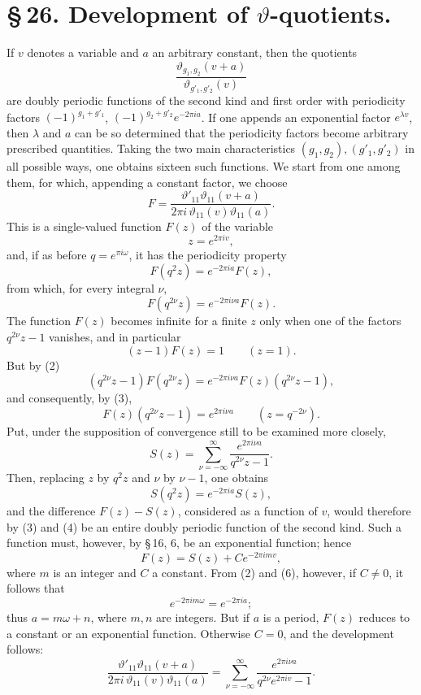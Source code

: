 \documentclass[11pt]{article}
\providecommand{\tht}{\vartheta}
\begin{document}
\section*{\S\,26. Development of $\vartheta$-quotients.}

If $v$ denotes a variable and $a$ an arbitrary constant, then the quotients
\[
\frac{\tht_{g_1,g_2}(v+a)}{\tht_{g'_1,g'_2}(v)}
\]
are doubly periodic functions of the second kind and first order with periodicity factors $(-1)^{g_1+g'_1}$, $(-1)^{g_2+g'_2}e^{-2\pi ia}$. If one appends an exponential factor $e^{\lambda v}$, then $\lambda$ and $a$ can be so determined that the periodicity factors become arbitrary prescribed quantities. Taking the two main characteristics $(g_1,g_2),(g'_1,g'_2)$ in all possible ways, one obtains sixteen such functions. We start from one among them, for which, appending a constant factor, we choose
\begin{equation}
F=\frac{\tht'_{11}\tht_{11}(v+a)}{2\pi i\,\tht_{11}(v)\tht_{11}(a)}.
\tag{1}
\end{equation}
This is a single-valued function $F(z)$ of the variable
\[
z=e^{2\pi iv},
\]
and, if as before $q=e^{\pi i\omega}$, it has the periodicity property
\begin{equation}
F(q^2z)=e^{-2\pi ia}F(z),
\tag{2}
\end{equation}
from which, for every integral $\nu$,
\[
F(q^{2\nu}z)=e^{-2\pi i\nu a}F(z).
\]
The function $F(z)$ becomes infinite for a finite $z$ only when one of the factors $q^{2\nu}z-1$ vanishes, and in particular
\begin{equation}
(z-1)F(z)=1\qquad (z=1).
\tag{3}
\end{equation}
But by (2)
\[
(q^{2\nu}z-1)F(q^{2\nu}z)=e^{-2\pi i\nu a}F(z)(q^{2\nu}z-1),
\]
and consequently, by (3),
\begin{equation}
F(z)(q^{2\nu}z-1)=e^{2\pi i\nu a}\qquad (z=q^{-2\nu}).
\tag{4}
\end{equation}
Put, under the supposition of convergence still to be examined more closely,
\begin{equation}
S(z)=\sum_{\nu=-\infty}^{\infty}\frac{e^{2\pi i\nu a}}{q^{2\nu}z-1}.
\tag{5}
\end{equation}
Then, replacing $z$ by $q^2z$ and $\nu$ by $\nu-1$, one obtains
\begin{equation}
S(q^2z)=e^{-2\pi ia}S(z),
\tag{6}
\end{equation}
and the difference $F(z)-S(z)$, considered as a function of $v$, would therefore by (3) and (4) be an entire doubly periodic function of the second kind. Such a function must, however, by \S\,16, 6, be an exponential function; hence
\[
F(z)=S(z)+Ce^{-2\pi imv},
\]
where $m$ is an integer and $C$ a constant. From (2) and (6), however, if $C\ne0$, it follows that
\[
e^{-2\pi im\omega}=e^{-2\pi ia};
\]
thus $a=m\omega+n$, where $m,n$ are integers. But if $a$ is a period, $F(z)$ reduces to a constant or an exponential function. Otherwise $C=0$, and the development follows:
\begin{equation}
\frac{\tht'_{11}\tht_{11}(v+a)}{2\pi i\,\tht_{11}(v)\tht_{11}(a)}
=\sum_{\nu=-\infty}^{\infty}\frac{e^{2\pi i\nu a}}{q^{2\nu}e^{2\pi iv}-1}.
\tag{7}
\end{equation}
\end{document}
